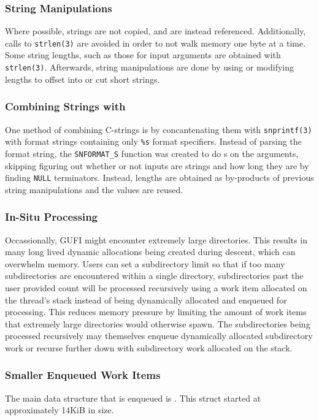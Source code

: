 \subsubsection{String Manipulations}
Where possible, strings are not copied, and are instead referenced.
Additionally, calls to \texttt{strlen(3)} are avoided in order to not
walk memory one byte at a time. Some string lengths, such as those for
input arguments are obtained with \texttt{strlen(3)}. Afterwards,
string manipulations are done by using or modifying lengths to offset
into or cut short strings.

\subsubsection{Combining Strings with \memcpy}
One method of combining C-strings is by concantenating them with
\texttt{snprintf(3)} with format strings containing only \texttt{\%s}
format specifiers. Instead of parsing the format string, the
\texttt{SNFORMAT\_S} function was created to do \memcpy s on the
arguments, skipping figuring out whether or not inputs are strings and
how long they are by finding \texttt{NULL} terminators. Instead,
lengths are obtained as by-products of previous string manipulations
and the values are reused.

\subsubsection{In-Situ Processing}
Occassionally, GUFI might encounter extremely large directories. This
results in many long lived dynamic allocations being created during
descent, which can overwhelm memory. Users can set a subdirectory
limit so that if too many subdirectories are encountered within a
single directory, subdirectories past the user provided count will be
processed recursively using a work item allocated on the thread's
stack instead of being dynamically allocated and enqueued for
processing. This reduces memory pressure by limiting the amount of
work items that extremely large directories would otherwise spawn. The
subdirectories being processed recursively may themselves enqueue
dynamically allocated subdirectory work or recurse further down with
subdirectory work allocated on the stack.

\subsubsection{Smaller Enqueued Work Items}
The main data structure that is enqueued is \work. This
struct started at approximately 14KiB in size.

